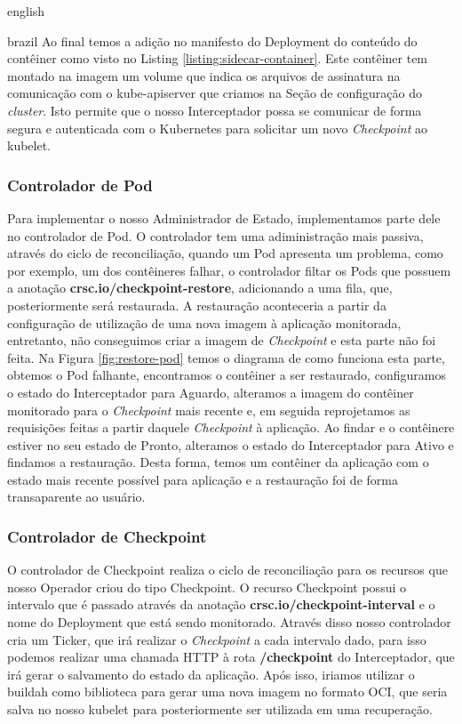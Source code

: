 \begin{otherlanguage*}{english}
\begin{otherlanguage*}{brazil}
Ao final temos a adição no manifesto do Deployment do conteúdo do contêiner como visto no
Listing \ref{listing:sidecar-container}. Este contêiner tem montado na imagem um volume
que indica os arquivos de assinatura na comunicação com o kube-apiserver que criamos na
Seção de configuração do \textit{cluster}. Isto permite que o nosso Interceptador possa
se comunicar de forma segura e autenticada com o Kubernetes para solicitar um novo
\textit{Checkpoint} ao kubelet.


\subsubsection{Controlador de Pod}

Para implementar o nosso Administrador de Estado, implementamos parte dele no controlador
de Pod. O controlador tem uma adiministração mais passiva, através do ciclo de
reconciliação, quando um Pod apresenta um problema, como por exemplo, um dos contêineres
falhar, o controlador filtar os Pods que possuem a anotação
\textbf{crsc.io/checkpoint-restore}, adicionando a uma fila, que, posteriormente será
restaurada. A restauração aconteceria a partir da configuração de utilização de uma nova
imagem à aplicação monitorada, entretanto, não conseguimos criar a imagem de
\textit{Checkpoint} e esta parte não foi feita. Na Figura \ref{fig:restore-pod} temos o
diagrama de como funciona esta parte, obtemos o Pod falhante, encontramos o contêiner a
ser restaurado, configuramos o estado do Interceptador para Aguardo, alteramos a imagem
do contêiner monitorado para o \textit{Checkpoint} mais recente e, em seguida
reprojetamos as requisições feitas a partir daquele \textit{Checkpoint} à aplicação. Ao
findar e o contêinere estiver no seu estado de Pronto, alteramos o estado do Interceptador
para Ativo e findamos a restauração. Desta forma, temos um contêiner da aplicação com o
estado mais recente possível para aplicação e a restauração foi de forma transaparente ao
usuário.


\subsubsection{Controlador de Checkpoint}

O controlador de Checkpoint realiza o ciclo de reconciliação para os recursos que nosso
Operador criou do tipo Checkpoint. O recurso Checkpoint possui o intervalo que é
passado através da anotação \textbf{crsc.io/checkpoint-interval} e o nome do Deployment
que está sendo monitorado. Através disso nosso controlador cria um Ticker, que irá
realizar o \textit{Checkpoint} a cada intervalo dado, para isso podemos realizar uma
chamada HTTP à rota \textbf{/checkpoint} do Interceptador, que irá gerar o salvamento do
estado da aplicação. Após isso, iriamos utilizar o buildah como biblioteca para gerar
uma nova imagem no formato OCI, que seria salva no nosso kubelet para posteriormente ser
utilizada em uma recuperação.


\end{otherlanguage*}
\end{otherlanguage*}
